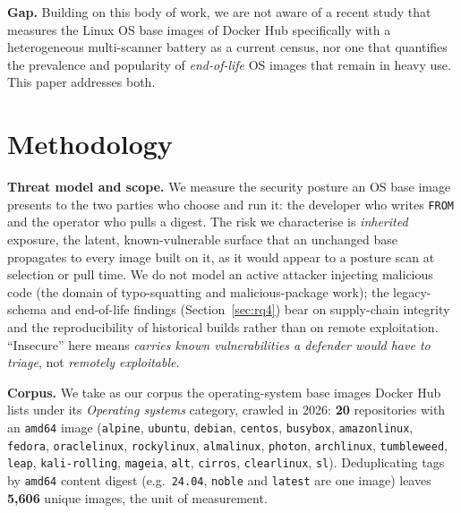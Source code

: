 \documentclass[12pt]{article}
\begin{document}
\noindent\textbf{Gap.} Building on this body of work, we are not aware of a recent study that measures
the Linux OS base images of Docker Hub specifically with a heterogeneous
multi-scanner battery as a current census, nor one that quantifies the
prevalence and popularity of \emph{end-of-life} OS images that remain in heavy
use. This paper addresses both.

\section{Methodology}
\label{sec:method}

\noindent\textbf{Threat model and scope.} We measure the security posture an OS
base image presents to the two parties who choose and run it: the developer who
writes \texttt{FROM} and the operator who pulls a digest. The risk we
characterise is \emph{inherited} exposure, the latent, known-vulnerable surface
that an unchanged base propagates to every image built on it, as it would appear
to a posture scan at selection or pull time. We do not model an active attacker
injecting malicious code (the domain of typo-squatting and malicious-package
work); the legacy-schema and end-of-life findings (Section~\ref{sec:rq4}) bear on
supply-chain integrity and the reproducibility of historical builds rather than
on remote exploitation. ``Insecure'' here means \emph{carries known
vulnerabilities a defender would have to triage}, not \emph{remotely
exploitable}.

\noindent\textbf{Corpus.} We take as our corpus the operating-system base images
Docker Hub lists under its \emph{Operating systems} category, crawled in 2026: \textbf{20}
repositories with an \texttt{amd64} image (\texttt{alpine}, \texttt{ubuntu},
\texttt{debian}, \texttt{centos}, \texttt{busybox}, \texttt{amazonlinux},
\texttt{fedora}, \texttt{oraclelinux}, \texttt{rockylinux}, \texttt{almalinux},
\texttt{photon}, \texttt{archlinux}, \texttt{tumbleweed}, \texttt{leap},
\texttt{kali-rolling}, \texttt{mageia}, \texttt{alt}, \texttt{cirros},
\texttt{clearlinux}, \texttt{sl}).
Deduplicating tags by \texttt{amd64} content digest (e.g.\ \texttt{24.04},
\texttt{noble} and \texttt{latest} are one image) leaves \textbf{5{,}606} unique
images, the unit of measurement.
\end{document}
